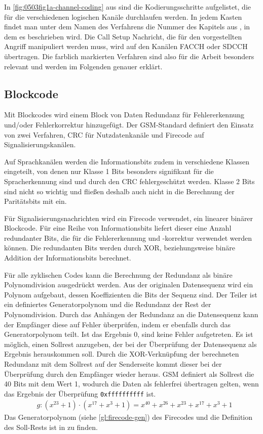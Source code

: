 In \autoref{fig:0503fig1a-channel-coding} aus \citet{3gpp:05.03} sind die Kodierungsschritte aufgelistet, die für die verschiedenen logischen Kanäle durchlaufen werden. In jedem Kasten findet man unter dem Namen des Verfahrens die Nummer des Kapitels aus \citet{3gpp:05.03}, in dem es beschrieben wird. Die Call Setup Nachricht, die für den vorgestellten Angriff manipuliert werden muss, wird auf den Kanälen \ac{FACCH} oder \ac{SDCCH} übertragen. Die farblich markierten Verfahren sind also für die Arbeit besonders relevant und werden im Folgenden genauer erklärt.

\subsection{Blockcode}\label{hdl:blockcode}

Mit Blockcodes wird einem Block von Daten Redundanz für Fehlererkennung und/oder Fehlerkorrektur hinzugefügt. Der \ac{GSM}-Standard definiert den Einsatz von zwei Verfahren, \ac{CRC} für Nutzdatenkanäle und Firecode auf Signalisierungskanälen.

Auf Sprachkanälen werden die Informationsbits zudem in verschiedene Klassen eingeteilt, von denen nur Klasse 1 Bits besonders signifikant für die Spracherkennung sind und durch den \ac{CRC} fehlergeschützt werden. Klasse 2 Bits sind nicht so wichtig und fließen deshalb auch nicht in die Berechnung der Paritätsbits mit ein.

Für Signalisierungsnachrichten wird ein Firecode verwendet, ein linearer binärer Blockcode. Für eine Reihe von Informationsbits liefert dieser eine Anzahl redundanter Bits, die für die Fehlererkennung und -korrektur verwendet werden können. Die redundanten Bits werden durch \ac{XOR}, beziehungsweise binäre Addition der Informationsbits berechnet. 

Für alle zyklischen Codes kann die Berechnung der Redundanz als binäre Polynomdivision ausgedrückt werden. Aus der originalen Datensequenz wird ein Polynom aufgebaut, dessen Koeffizienten die Bits der Sequenz sind. Der Teiler ist ein definiertes Generatorpolynom und die Redundanz der Rest der Polynomdivision. Durch das Anhängen der Redundanz an die Datensequenz kann der Empfänger diese auf Fehler überprüfen, indem er ebenfalls durch das Generatorpolynom teilt. Ist das Ergebnis 0, sind keine Fehler aufgetreten. Es ist möglich, einen Sollrest anzugeben, der bei der Überprüfung der Datensequenz als Ergebnis herauskommen soll. Durch die \ac{XOR}-Verknüpfung der berechneten Redundanz mit dem Sollrest auf der Senderseite kommt dieser bei der Überprüfung durch den Empfänger wieder heraus. \ac{GSM} definiert als Sollrest die 40 Bits mit dem Wert 1, wodurch die Daten als fehlerfrei übertragen gelten, wenn das Ergebnis der Überprüfung \texttt{0xffffffffff} ist.
\begin{align}
&g: (x^{23} + 1) \cdot (x^{17} + x^3 + 1) = x^{40} + x^{26} + x^{23} + x^{17} + x^{3} + 1 \label{gl:firecode-gen}
\end{align}
Das Generatorpolynom (siehe \autoref{gl:firecode-gen}) des Firecodes und die Definition des Soll-Rests ist in  zu finden.

